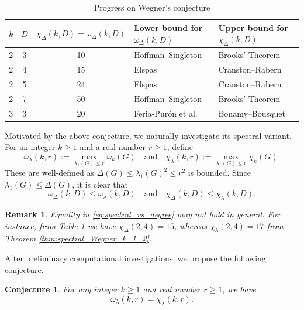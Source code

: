 \documentclass[11pt]{article}
\theoremstyle{plain}
\newtheorem{conjecture}[theorem]{Conjecture}
\newtheorem*{remark}{Remark}
\numberwithin{equation}{section}
\begin{document}
\begin{table}[ht]
    \centering
    \begin{tabular}{c c c l l}
    \hline
  $k$ &  $D$ & $\chi_\Delta(k,D) =\omega_\Delta(k,D)$ & Lower bound for $\omega_\Delta(k,D)$ & Upper bound for $\chi_\Delta(k,D)$\\
  \hline
   2 & 3 & 10 & Hoffman--Singleton \cite{Hoffman_Singleton_1960} & Brooks' Theorem\\ 
   2 & 4 & 15 & Elspas \cite{Elspas_1964} & Cranston--Rabern \cite{Cranston_Rabern_2016} \\
   2 & 5 & 24 & Elspas \cite{Elspas_1964} & Cranston--Rabern \cite{Cranston_Rabern_2016} \\
   2 & 7 & 50 & Hoffman--Singleton \cite{Hoffman_Singleton_1960} & Brooks' Theorem\\
   3 & 3 & 20 & Feria-Pur\'{o}n et al. \cite{Puron_Miller_Guillermo_2011} & Bonamy--Bousquet \cite{Bonamy_Bousquet_2014} \\
   \hline
\end{tabular}
    \caption{Progress on Wegner's conjecture}
    \label{table:Wegner}
\end{table}

Motivated by the above conjecture, we naturally investigate its spectral variant. For an integer $k\ge  1$ and a real number $r\ge 1$, define 
\[ \omega_\lambda(k,r):= \max_{\lambda_1(G)\le r}\omega_k(G)\quad \text{and}\quad \chi_\lambda(k,r):= \max_{\lambda_1(G)\le r}\chi_k(G).\]
These are well-defined as $\Delta(G)\le \lambda_1(G)^2 \le r^2$ is bounded. Since $\lambda_1(G)\le \Delta(G)$, it is clear that 
\begin{equation}\label{eq:spectral_vs_degree}
   \omega_\Delta(k,D)\le \omega_\lambda(k,D)\quad \text{and}\quad \chi_\Delta(k,D)\le \chi_\lambda(k,D). 
\end{equation}

\begin{remark}
    Equality in \eqref{eq:spectral_vs_degree} may not hold in general. For instance, from Table \ref{table:Wegner} we have $\chi_\Delta(2,4) = 15$, whereas $\chi_\lambda(2,4) = 17$ from Theorem \ref{thm:spectral_Wegner_k_1_2}. 
\end{remark}

After preliminary computational investigations, we propose the following conjecture.

\begin{conjecture}\label{conj:spectraL_Wegner} For any integer $k\ge 1$ and real number $r\ge 1$, we have 
\[ \omega_\lambda(k,r) = \chi_\lambda(k,r).\]
\end{conjecture}
\end{document}
